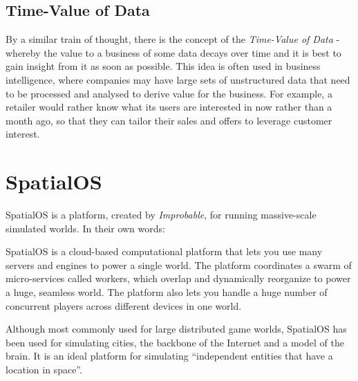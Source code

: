 \documentclass[a4paper,11pt,titlepage]{report}
\begin{document}
\subsection{Time-Value of Data}
By a similar train of thought, there is the concept of the \textit{Time-Value of Data} - whereby the value to a business of some data decays over time and it is best to gain insight from it as soon as possible. This idea is often used in business intelligence, where companies may have large sets of unstructured data that need to be processed and analysed to derive value for the business. For example, a retailer would rather know what its users are interested in now rather than a month ago, so that they can tailor their sales and offers to leverage customer interest.

\newpage
\section{SpatialOS}
SpatialOS is a platform, created by \textit{Improbable}\cite{ImprobableWorldsLtd.2018a}, for running massive-scale simulated worlds. In their own words\cite{ImprobableWorldsLtd.2018b}:
\begin{displayquote}
SpatialOS is a cloud-based computational platform that lets you use many servers and engines to power a single world. The platform coordinates a swarm of micro-services called workers, which overlap and dynamically reorganize to power a huge, seamless world. The platform also lets you handle a huge number of concurrent players across different devices in one world.
\end{displayquote}

Although most commonly used for large distributed game worlds, SpatialOS has been used for simulating cities\cite{Narula2017}, the backbone of the Internet\cite{ImprobableWorldsLtd.2016} and a model of the brain\cite{ImprobableWorldsLtd.2018}. It is an ideal platform for simulating ``independent entities that have a location in space''\cite{ImprobableWorldsLtd.2018}.
\end{document}
